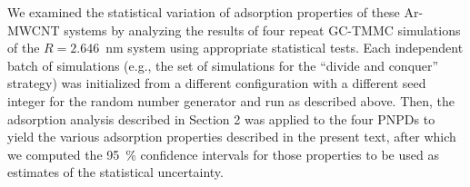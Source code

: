 We examined the statistical variation of adsorption properties of these Ar-MWCNT systems by analyzing the results of four repeat GC-TMMC simulations of the $R=2.646$~nm system using appropriate statistical tests. Each independent batch of simulations (e.g., the set of simulations for the ``divide and conquer'' strategy) was initialized from a different configuration with a different seed integer for the random number generator and run as described above. Then, the adsorption analysis described in Section 2 was applied to the four PNPDs to yield the various adsorption properties described in the present text, after which we computed the 95~\% confidence intervals for those properties to be used as estimates of the statistical uncertainty.
